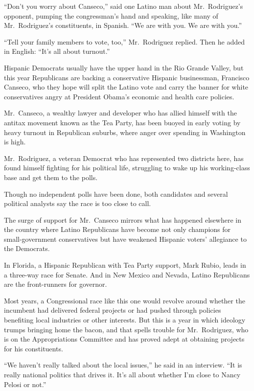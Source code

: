 ﻿\documentclass[12pt]{article}
\begin{document}
``Don't you worry about Canseco,'' said one Latino man about Mr.~Rodriguez's opponent, pumping the
congressman's hand and speaking, like many of Mr.~Rodriguez's constituents, in Spanish. ``We are
with you. We are with you.''

``Tell your family members to vote, too,'' Mr.~Rodriguez replied. Then he added in English: ``It's
all about turnout.''

Hispanic Democrats usually have the upper hand in the Rio Grande Valley, but this year Republicans
are backing a conservative Hispanic businessman, Francisco Canseco, who they hope will split the
Latino vote and carry the banner for white conservatives angry at President Obama's economic and
health care policies.

Mr.~Canseco, a wealthy lawyer and developer who has allied himself with the antitax movement known
as the Tea Party, has been buoyed in early voting by heavy turnout in Republican suburbs, where
anger over spending in Washington is high.

Mr.~Rodriguez, a veteran Democrat who has represented two districts here, has found himself fighting
for his political life, struggling to wake up his working-class base and get them to the polls.

Though no independent polls have been done, both candidates and several political analysts say the
race is too close to call.

The surge of support for Mr.~Canseco mirrors what has happened elsewhere in the country where Latino
Republicans have become not only champions for small-government conservatives but have weakened
Hispanic voters' allegiance to the Democrats.

In Florida, a Hispanic Republican with Tea Party support, Mark Rubio, leads in a three-way race for
Senate. And in New Mexico and Nevada, Latino Republicans are the front-runners for governor.

Most years, a Congressional race like this one would revolve around whether the incumbent had
delivered federal projects or had pushed through policies benefiting local industries or other
interests. But this is a year in which ideology trumps bringing home the bacon, and that spells
trouble for Mr.~Rodriguez, who is on the Appropriations Committee and has proved adept at obtaining
projects for his constituents.

``We haven't really talked about the local issues,'' he said in an interview. ``It is really
national politics that drives it. It's all about whether I'm close to Nancy Pelosi or not.''
\end{document}
